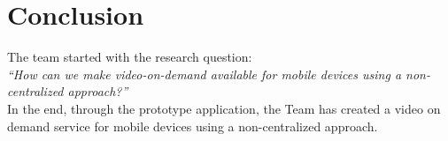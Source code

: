 \section{Conclusion}
\thispagestyle{fancy}
The team started with the research question:\\

\textit{``How can we make video-on-demand available for mobile devices using a non-centralized approach?''}\\

In the end, through the prototype application, the Team has created a video on demand service for mobile devices using a non-centralized approach. 
